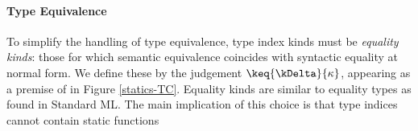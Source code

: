 \paragraph{Type Equivalence} 
To simplify the handling of type equivalence, type index kinds must be \emph{equality kinds}: those for which semantic equivalence coincides with syntactic equality at normal form. We define these by the judgement $\keq{\kDelta}{\kappa}$, appearing as a premise of  in Figure \ref{statics-TC}. Equality kinds are similar to equality types as found in Standard ML. The main implication of this choice is that type indices cannot contain static functions%



